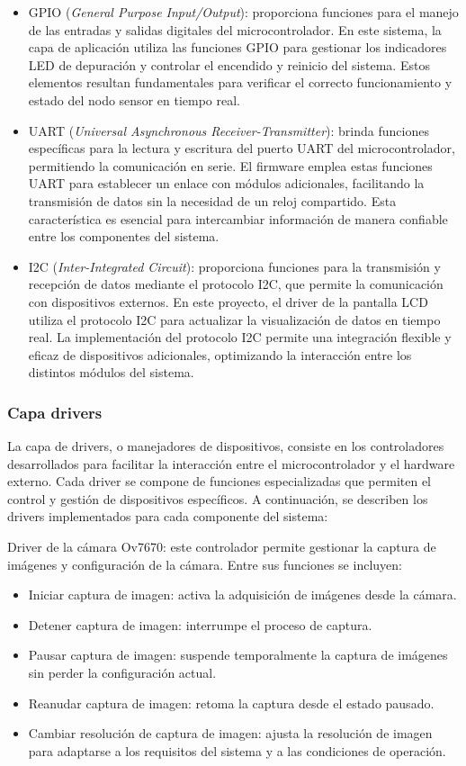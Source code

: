\begin{itemize}
\item GPIO (\textit{General Purpose Input/Output}): proporciona funciones para el manejo de las entradas y salidas digitales del microcontrolador. En este sistema, la capa de aplicación utiliza las funciones GPIO para gestionar los indicadores LED de depuración y controlar el encendido y reinicio del sistema. Estos elementos resultan fundamentales para verificar el correcto funcionamiento y estado del nodo sensor en tiempo real.
\item UART (\textit{Universal Asynchronous Receiver-Transmitter}): brinda funciones específicas para la lectura y escritura del puerto UART del microcontrolador, permitiendo la comunicación en serie. El firmware emplea estas funciones UART para establecer un enlace con módulos adicionales, facilitando la transmisión de datos sin la necesidad de un reloj compartido. Esta característica es esencial para intercambiar información de manera confiable entre los componentes del sistema.
\item I2C (\textit{Inter-Integrated Circuit}): proporciona funciones para la transmisión y recepción de datos mediante el protocolo I2C, que permite la comunicación con dispositivos externos. En este proyecto, el driver de la pantalla LCD utiliza el protocolo I2C para actualizar la visualización de datos en tiempo real. La implementación del protocolo I2C permite una integración flexible y eficaz de dispositivos adicionales, optimizando la interacción entre los distintos módulos del sistema.
\end{itemize}

\subsubsection{Capa drivers}
\label{Capa_drivers}

La capa de drivers, o manejadores de dispositivos, consiste en los controladores desarrollados para facilitar la interacción entre el microcontrolador y el hardware externo. Cada driver se compone de funciones especializadas que permiten el control y gestión de dispositivos específicos. A continuación, se describen los drivers implementados para cada componente del sistema:

Driver de la cámara Ov7670: este controlador permite gestionar la captura de imágenes y configuración de la cámara. Entre sus funciones se incluyen:
\begin{itemize}
\item Iniciar captura de imagen: activa la adquisición de imágenes desde la cámara.
\item Detener captura de imagen: interrumpe el proceso de captura.
\item Pausar captura de imagen: suspende temporalmente la captura de imágenes sin perder la configuración actual.
\item Reanudar captura de imagen: retoma la captura desde el estado pausado.
\item Cambiar resolución de captura de imagen: ajusta la resolución de imagen para adaptarse a los requisitos del sistema y a las condiciones de operación.
\end{itemize}

